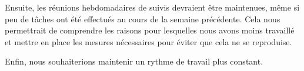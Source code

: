 \begin{spacing}{1.5}
    Ensuite, les réunions hebdomadaires de suivis devraient être maintenues, même si peu de tâches ont été effectués au cours de la semaine précédente.
    Cela nous permettrait de comprendre les raisons pour lesquelles nous avons moins travaillé et mettre en place les mesures nécessaires pour éviter que cela ne se reproduise.
\end{spacing}

\begin{spacing}{1.5}
    Enfin, nous souhaiterions maintenir un rythme de travail plus constant.
\end{spacing}
